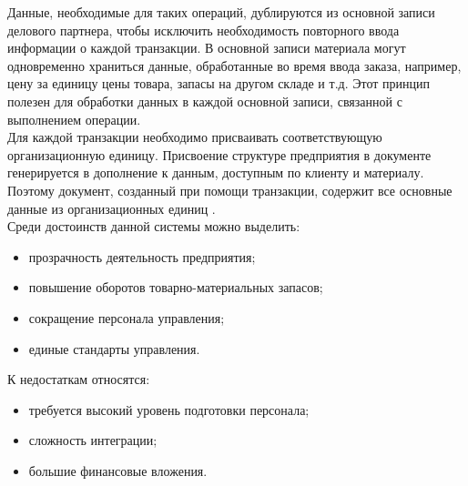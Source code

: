 Данные, необходимые для таких операций, дублируются из основной записи делового партнера, чтобы исключить необходимость повторного ввода информации о каждой транзакции. 
В основной записи материала могут одновременно храниться данные, обработанные во время ввода заказа, например, цену за единицу цены товара, запасы на другом складе и т.д. 
Этот принцип полезен для обработки данных в каждой основной записи, связанной с выполнением операции.\\
\indent Для каждой транзакции необходимо присваивать соответствующую организационную единицу. 
Присвоение структуре предприятия в документе генерируется в дополнение к данным, доступным по клиенту и материалу. 
Поэтому документ, созданный при помощи транзакции, содержит все основные данные из организационных единиц \cite{gehBook}.\\
\indent Среди достоинств данной системы можно выделить:

\begin{itemize}
	\item прозрачность деятельность предприятия;
	\item повышение оборотов товарно-материальных запасов;
	\item сокращение персонала управления;
	\item единые стандарты управления.
\end{itemize}

\indent К недостаткам относятся:

\begin{itemize}
	\item требуется высокий уровень подготовки персонала;
	\item сложность интеграции;
	\item большие финансовые вложения.
\end{itemize}

